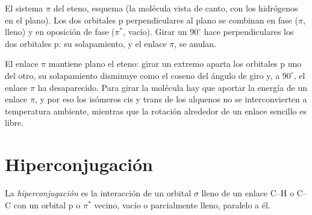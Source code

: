 \begin{omfigure}

{\small El sistema $\pi$ del eteno, esquema (la molécula vista de canto, con los
hidrógenos en el plano). Los dos orbitales p perpendiculares al plano se combinan
en fase ($\pi$, lleno) y en oposición de fase ($\pi^*$, vacío). Girar un 
$90^\circ$ hace perpendiculares los dos orbitales p: su solapamiento, y el enlace $\pi$,
se anulan.}
\end{omfigure}

El enlace $\pi$ mantiene plano el eteno: girar un extremo aparta los orbitales p
uno del otro, su solapamiento disminuye como el coseno del ángulo de giro y, a $90^\circ$,
el enlace $\pi$ ha desaparecido. Para girar la molécula hay que aportar la energía de un enlace $\pi$,
y por eso los isómeros cis y trans de los alquenos no se interconvierten a
temperatura ambiente, mientras que la rotación alrededor de un enlace sencillo es libre.

\section{Hiperconjugación}

\begin{definition}[Hiperconjugación]\label{def:b2:fragment-orbitals:hyperconjugation}
La \emph{hiperconjugación} es la interacción de un orbital
$\sigma$ lleno de un enlace C--H o C--C con un orbital p o $\pi^*$ vecino, vacío o parcialmente
lleno, paralelo a él.
\end{definition}

